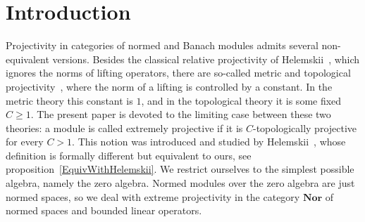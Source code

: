 \documentclass[12pt]{article}
\newcommand{\Nor}{\mathbf{Nor}}
\begin{document}

\section{Introduction}\label{SectionIntroduction}

Projectivity in categories of normed and Banach modules admits several
non-equivalent versions. Besides the classical relative projectivity of
Helemskii~\cite{HelHomolBanTopAlg}, which ignores the norms of lifting
operators, there are so-called metric and topological
projectivity~\cite{HelMetrFrQMod, WhiteInjmoduAlg}, where the
norm of a lifting is controlled by a constant. In the metric theory this
constant is $1$, and in the topological theory it is some fixed $C\geq 1$. The
present paper is devoted to the limiting case between these two theories: a
module is called extremely projective if it is $C$-topologically projective for
every $C>1$. This notion was introduced and studied by
Helemskii~\cite{HelExtrProjSeqAlg, HelMetrFrQMod}, whose definition is
formally different but equivalent to ours, see
proposition~\ref{EquivWithHelemskii}. We restrict
ourselves to the simplest possible algebra, namely the zero algebra. Normed
modules over the zero algebra are just normed spaces, so we deal with extreme
projectivity in the category $\Nor$ of normed spaces and bounded linear
operators.
\end{document}

